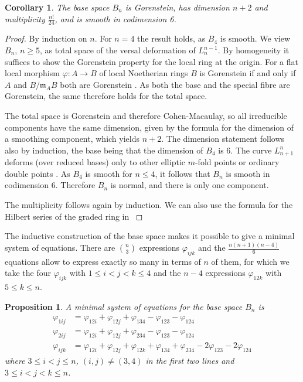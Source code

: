 \documentclass[12pt,a4paper]{amsart}  %
\newcommand{\vp}{\varphi}
\newtheorem{cor}[thm]{Corollary}
\newtheorem{prop}[thm]{Proposition}
\theoremstyle{definition}
\theoremstyle{remark}
\begin{document}
\begin{cor}
The base space $B_n$ is Gorenstein, has dimension $n+2$ and multiplicity  $\frac{n!}{24}$, and is smooth in codimension 6.
\end{cor}
\begin{proof}
By induction on $n$. For $n=4$ the result holds, as $B_4$ is smooth.
We view $B_n$, $n\geq5$, as total space of the versal deformation  of $L_{n}^{n-1}$. By homogeneity it suffices to show the Gorenstein property 
for the local ring at the origin. For a flat local morphism $\vp \colon A\to B$ of 
local Noetherian rings $B$ is Gorenstein if and only if $A$ and $B/\mathfrak{m}_AB$
both are Gorenstein \cite[Thm. 23.4]{Mat}.	As both the base and the special fibre
are Gorenstein, the same therefore holds for the total space.

The total space is Gorenstein and therefore Cohen-Macaulay, so all irreducible components have the same dimension, given by
the formula for the dimension
of  a smoothing component, which yields $n+2$. The dimension statement follows also by induction, the base being that 
the dimension of $B_4$ is 6. 
The curve $L_{n+1}^n$ deforms (over reduced bases)
only to other elliptic $m$-fold points or ordinary double points \cite[Prop. 3.6]{Gr}.  As $B_4$ is smooth for $n\leq 4$, it follows that $B_n$ is smooth in codimension 6.
Therefore $B_n$ is normal, and there is only one component.

The multiplicity follows again by induction. We can also use the formula for the Hilbert series of the graded ring in \cite[Cor. 1.1.7]{LP}
\end{proof}


The inductive construction of the base space makes it possible to give a minimal
system of equations. 
%
There are $\binom n3$ expressions $\vp_{ijk}$ and the
$ \frac{n(n+1)(n-4)}6$ equations allow to express exactly so many in terms of
$n$ of them, for which we take the four $\vp_{ijk}$ with $1\leq i < j < k \leq4$
and the $n-4$ expressions $\vp_{12k}$ with $5\leq k \leq n$.

\begin{prop}\label{base-prop}
A minimal system of equations for the base space $B_n$  is
\begin{align*}
\vp_{1ij} & = \vp_{12i}+\vp_{12j}+\vp_{134}-\vp_{123}-\vp_{124} \\
\vp_{2ij} & = \vp_{12i}+\vp_{12j}+\vp_{234}-\vp_{123}-\vp_{124} \\
\vp_{ijk} & = \vp_{12i}+\vp_{12j}+\vp_{12k}+\vp_{134}+  
                          \vp_{234}-2\vp_{123}-2\vp_{124} 
\end{align*}
where $3\leq i<j\leq n$, $(i,j)\neq (3,4)$ in the first two lines and 
$3\leq i<j<k\leq n$.
\end{prop}
\end{document}
